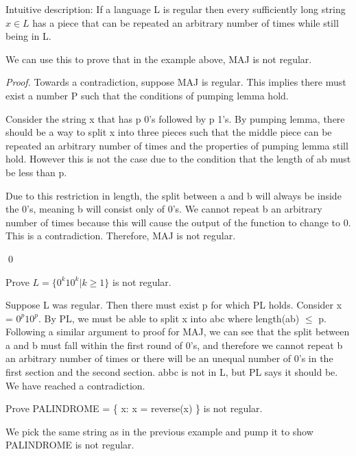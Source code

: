 Intuitive description: If a language L is regular then every sufficiently long string $x \in L$ has a piece that can be repeated an arbitrary number of times while still being in L.

We can use this to prove that in the example above, MAJ is not regular.

\begin{proof}

    Towards a contradiction, suppose MAJ is regular. This implies there must exist a number P such that the conditions of pumping lemma hold.

    Consider the string x that has p 0's followed by p 1's. By pumping lemma, there should be a way to split x into three pieces such that the middle piece can be repeated an arbitrary number of times and the properties of pumping lemma still hold. However this is not the case due to the condition that the length of ab must be less than p. 

    Due to this restriction in length, the split between a and b will always be inside the 0's, meaning b will consist only of 0's. We cannot repeat b an arbitrary number of times because this will cause the output of the function to change to 0. This is a contradiction. Therefore, MAJ is not regular.
    
    \qed
\end{proof}

\begin{example}
    
    Prove $L = \{0^k10^k | k \ge 1\}$ is not regular.

    Suppose L was regular. Then there must exist p for which PL holds. Consider x = $0^p 1 0^p$. By PL, we must be able to split x into abc where length(ab) $\leq$ p. Following a similar argument to proof for MAJ, we can see that the split between a and b must fall within the first round of 0's, and therefore we cannot repeat b an arbitrary number of times or there will be an unequal number of 0's in the first section and the second section. abbc is not in L, but PL says it should be. We have reached a contradiction.
\end{example}

\begin{example}

    Prove PALINDROME = \{ x: x = reverse(x) \} is not regular.

    We pick the same string as in the previous example and pump it to show PALINDROME is not regular.
\end{example}

